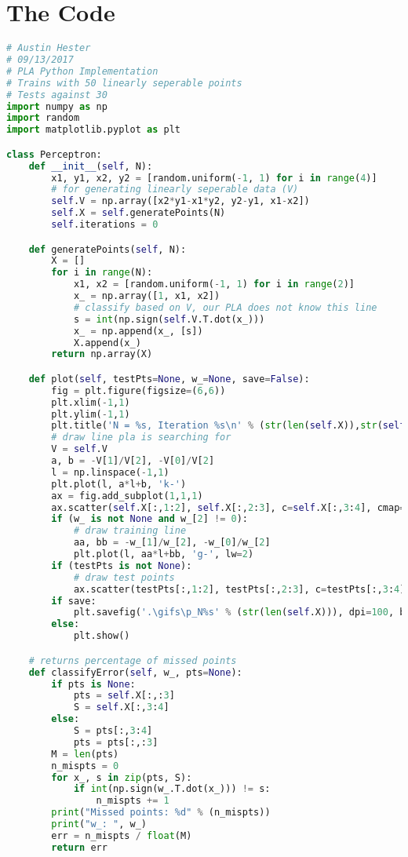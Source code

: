 \documentclass{article}
\begin{document}
\section*{The Code}
\lstset{
	frame=tb,
	tabsize=4,
	showstringspaces=false
}
\begin{lstlisting}[language=Python,breaklines=true]
# Austin Hester
# 09/13/2017
# PLA Python Implementation
# Trains with 50 linearly seperable points
# Tests against 30
import numpy as np
import random
import matplotlib.pyplot as plt

class Perceptron:
    def __init__(self, N):
        x1, y1, x2, y2 = [random.uniform(-1, 1) for i in range(4)]
        # for generating linearly seperable data (V)
        self.V = np.array([x2*y1-x1*y2, y2-y1, x1-x2])
        self.X = self.generatePoints(N)
        self.iterations = 0

    def generatePoints(self, N):
        X = []
        for i in range(N):
            x1, x2 = [random.uniform(-1, 1) for i in range(2)]
            x_ = np.array([1, x1, x2])
            # classify based on V, our PLA does not know this line
            s = int(np.sign(self.V.T.dot(x_)))
            x_ = np.append(x_, [s])
            X.append(x_)
        return np.array(X)

    def plot(self, testPts=None, w_=None, save=False):
        fig = plt.figure(figsize=(6,6))
        plt.xlim(-1,1)
        plt.ylim(-1,1)
        plt.title('N = %s, Iteration %s\n' % (str(len(self.X)),str(self.iterations)))
        # draw line pla is searching for
        V = self.V
        a, b = -V[1]/V[2], -V[0]/V[2]
        l = np.linspace(-1,1)
        plt.plot(l, a*l+b, 'k-')
        ax = fig.add_subplot(1,1,1)
        ax.scatter(self.X[:,1:2], self.X[:,2:3], c=self.X[:,3:4], cmap='prism')
        if (w_ is not None and w_[2] != 0):
            # draw training line
            aa, bb = -w_[1]/w_[2], -w_[0]/w_[2]
            plt.plot(l, aa*l+bb, 'g-', lw=2)
        if (testPts is not None):
            # draw test points
            ax.scatter(testPts[:,1:2], testPts[:,2:3], c=testPts[:,3:4], cmap='cool')
        if save:
            plt.savefig('.\gifs\p_N%s' % (str(len(self.X))), dpi=100, bbox_inches='tight')
        else:
            plt.show()

    # returns percentage of missed points
    def classifyError(self, w_, pts=None):
        if pts is None:
            pts = self.X[:,:3]
            S = self.X[:,3:4]
        else:
            S = pts[:,3:4]
            pts = pts[:,:3]
        M = len(pts)
        n_mispts = 0
        for x_, s in zip(pts, S):
            if int(np.sign(w_.T.dot(x_))) != s:
                n_mispts += 1
        print("Missed points: %d" % (n_mispts))
        print("w_: ", w_)
        err = n_mispts / float(M)
        return err


\end{lstlisting}
\end{document}
